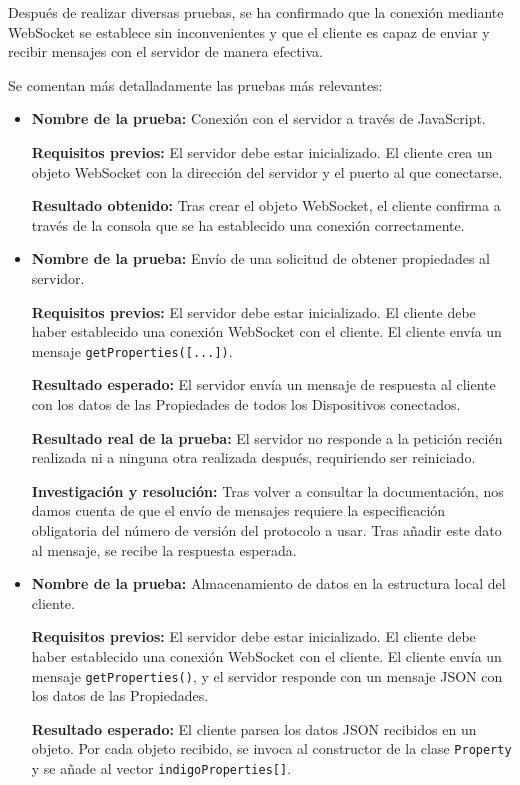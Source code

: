 Después de realizar diversas pruebas, se ha confirmado que la conexión mediante WebSocket se establece sin inconvenientes y que el cliente es capaz de enviar y recibir mensajes con el servidor de manera efectiva.

Se comentan más detalladamente las pruebas más relevantes:

\begin{itemize}
\item \textbf{Nombre de la prueba:} Conexión con el servidor a través de JavaScript.

\textbf{Requisitos previos:} El servidor debe estar inicializado. El cliente crea un objeto WebSocket con la dirección del servidor y el puerto al que conectarse.

\textbf{Resultado obtenido:} Tras crear el objeto WebSocket, el cliente confirma a través de la consola que se ha establecido una conexión correctamente.

\item \textbf{Nombre de la prueba:} Envío de una solicitud de obtener propiedades al servidor.

\textbf{Requisitos previos:} El servidor debe estar inicializado. El cliente debe haber establecido una conexión WebSocket con el cliente. El cliente envía un mensaje \texttt{getProperties([...])}.

\textbf{Resultado esperado:} El servidor envía un mensaje de respuesta al cliente con los datos de las Propiedades de todos los Dispositivos conectados.

\textbf{Resultado real de la prueba:} El servidor no responde a la petición recién realizada ni a ninguna otra realizada después, requiriendo ser reiniciado.

\textbf{Investigación y resolución:} Tras volver a consultar la documentación, nos damos cuenta de que el envío de mensajes requiere la especificación obligatoria del número de versión del protocolo a usar. Tras añadir este dato al mensaje, se recibe la respuesta esperada.

\item \textbf{Nombre de la prueba:} Almacenamiento de datos en la estructura local del cliente.

\textbf{Requisitos previos:} El servidor debe estar inicializado. El cliente debe haber establecido una conexión WebSocket con el cliente. El cliente envía un mensaje \texttt{getProperties()}, y el servidor responde con un mensaje JSON con los datos de las Propiedades.

\textbf{Resultado esperado:} El cliente parsea los datos JSON recibidos en un objeto. Por cada objeto recibido, se invoca al constructor de la clase \texttt{Property} y se añade al vector \texttt{indigoProperties[]}.
 

\end{itemize}
